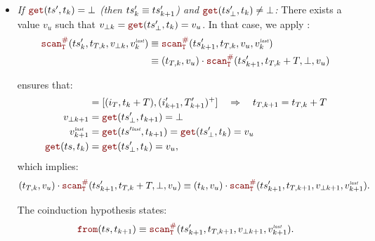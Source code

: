 \begin{skippableproof}
\begin{itemize}
\begin{itemize}
                  \item \textit{If $\getAt{\ts'}{t_k} = \bot$ (then $ts'_k \equiv ts'_{k+1}$) and
                        $\getAt{\ts'_\bot}{t_k} \neq \bot$:} There exists a value $v_u$ such that
                        $v_{\bot k} = \getAt{\ts'_\bot}{t_k} = v_u$. In that case, we apply
                        :
                        \begin{align*}
                            \scanAux{\ts'_k}{T}{t_{T, k}}{v_{\bot k}}{v^\explast_k} & \equiv
                            \scanAux{\ts'_{k+1}}{T}{t_{T, k}}{v_u}{v^\explast_k}             \\
                                                                                    & \equiv
                            (t_{T, k}, v_u) \next \scanAux{\ts'_{k+1}}{T}{t_{T, k} + T}{\bot}{v_u}
                        \end{align*}

                         ensures that:
                        \begin{align*}
                            [(i_{k+1}, T_{k+1})^+] & = [(i_T, t_k + T), (i'_{k+1}, T'_{k+1})^+]
                            \quad \Rightarrow \quad t_{T, k+1} = t_{T, k} + T                                               \\
                            v_{\bot k+1}           & = \getAt{\ts'_\bot}{t_{k+1}} = \bot                                    \\
                            v^\explast_{k+1}       & = \getAt{\ts^{\prime\explast}}{t_{k+1}} = \getAt{\ts'_\bot}{t_k} = v_u \\
                            \getAt{\ts}{t_k}       & = \getAt{\ts'_\bot}{t_k} = v_u,
                        \end{align*}
                        which implies:
                        \begin{equation*}
                            (t_{T, k}, v_u) \next \scanAux{\ts'_{k+1}}{T}{t_{T, k} + T}{\bot}{v_u} \equiv
                            (t_k, v_u) \next \scanAux{\ts'_{k+1}}{T}{t_{T, k+1}}{v_{\bot k+1}}{v^\explast_{k+1}}.
                        \end{equation*}

                        The coinduction hypothesis states:
                        \begin{equation*}
                            \from{\ts}{t_{k+1}} \equiv \scanAux{\ts'_{k+1}}{T}{t_{T, k+1}}{v_{\bot k+1}}{v^\explast_{k+1}}.
                        \end{equation*}


\end{itemize}
\end{itemize}
\end{skippableproof}
